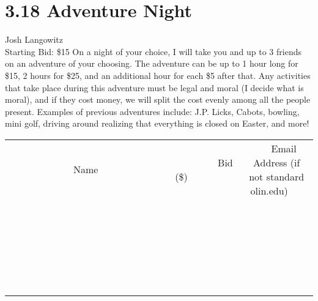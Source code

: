 \documentclass[11pt]{article}
\begin{document}
\section*{3.18 Adventure Night}
Josh Langowitz
\\
Starting Bid: \$15
\newline
On a night of your choice, I will take you and up to 3 friends on an adventure of your choosing. The adventure can be up to 1 hour long for \$15, 2 hours for \$25, and an additional hour for each \$5 after that. Any activities that take place during this adventure must be legal and moral (I decide what is moral), and if they cost money, we will split the cost evenly among all the people present. Examples of previous adventures include: J.P. Licks, Cabots, bowling, mini golf, driving around realizing that everything is closed on Easter, and more!
\\[6ex]
\begin{tabular}{c c c}
~~~~~~~~~~~~~Name~~~~~~~~~~~~~ & ~~~~~~~~~Bid (\$)~~~~~~~~~  & ~~~Email Address (if not standard olin.edu)~~~\\
 & & \\
\hline
 & & \\
\hline
 & & \\
\hline
 & & \\
\hline
 & & \\
\hline
 & & \\
\hline
 & & \\
\hline
 & & \\
\hline
 & & \\
\hline
 & & \\
\hline
 & & \\
\hline
 & & \\
\hline
 & & \\
\hline
 & & \\
\hline
 & & \\
\hline
 & & \\
\hline
 & & \\
\hline
 & & \\
\hline
 & & \\
\hline
 & & \\
\hline
 & & \\
\hline
 & & \\
\hline
 & & \\
\hline
 & & \\
\hline
 & & \\
\hline
 & & \\
\hline
\end{tabular}
\newpage
\end{document}
